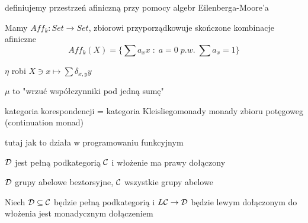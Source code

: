 definiujemy przestrzeń afiniczną przy pomocy algebr Eilenberga-Moore'a

Mamy $Aff_k:Set\to Set$, zbiorowi przyporządkowuje skończone kombinacje afiniczne
$$Aff_k(X)=\{\sum a_xx\;:\;a=0\;p.w.\;\sum a_x=1\}$$

$\eta$ robi $X\ni x\mapsto \sum \delta_{x,y}y$

$\mu$ to "wrzuć współczynniki pod jedną sumę"

kategoria korespondencji = kategoria Kleisliegomonady monady zbioru potęgoweg (continuation monad)

tutaj jak to działa w programowaniu funkcyjnym

$\mathcal{D}$ jest pełną podkategorią $\mathcal{C}$ i włożenie ma prawy dołączony

$\mathcal{D}$ grupy abelowe beztorsyjne, $\mathcal{C}$ wszystkie grupy abelowe


\begin{fact}{}{}
  Niech $\mathcal{D}\subseteq\mathcal{C}$ będzie pełną podkategorią i $L\mathcal{C}\to \mathcal{D}$ będzie lewym dołączonym do włożenia jest monadycznym dołączeniem
\end{fact}




